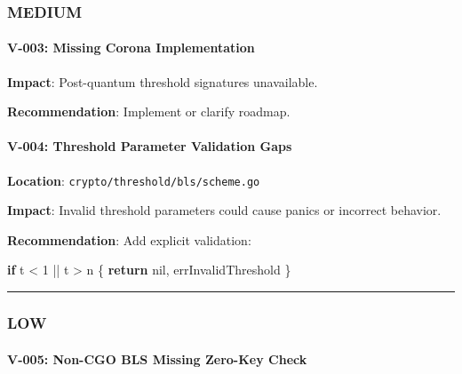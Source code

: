 \documentclass[
]{article}
\newenvironment{Shaded}{}{}
\newcommand{\ControlFlowTok}[1]{\textcolor[rgb]{0.00,0.44,0.13}{\textbf{#1}}}
\newcommand{\DecValTok}[1]{\textcolor[rgb]{0.25,0.63,0.44}{#1}}
\newcommand{\NormalTok}[1]{#1}
\newcommand{\OperatorTok}[1]{\textcolor[rgb]{0.40,0.40,0.40}{#1}}
\newcommand{\OtherTok}[1]{\textcolor[rgb]{0.00,0.44,0.13}{#1}}
\begin{document}
\subsubsection{MEDIUM}\label{medium}

\paragraph{V-003: Missing Corona
Implementation}\label{v-003-missing-corona-implementation}

\textbf{Impact}: Post-quantum threshold signatures unavailable.

\textbf{Recommendation}: Implement or clarify roadmap.

\paragraph{V-004: Threshold Parameter Validation
Gaps}\label{v-004-threshold-parameter-validation-gaps}

\textbf{Location}: \texttt{crypto/threshold/bls/scheme.go}

\textbf{Impact}: Invalid threshold parameters could cause panics or
incorrect behavior.

\textbf{Recommendation}: Add explicit validation:

\begin{Shaded}
\begin{Highlighting}[]
\ControlFlowTok{if}\NormalTok{ t }\OperatorTok{\textless{}} \DecValTok{1} \OperatorTok{||}\NormalTok{ t }\OperatorTok{\textgreater{}}\NormalTok{ n }\OperatorTok{\{}
    \ControlFlowTok{return} \OtherTok{nil}\OperatorTok{,}\NormalTok{ errInvalidThreshold}
\OperatorTok{\}}
\end{Highlighting}
\end{Shaded}

\begin{center}\rule{0.5\linewidth}{0.5pt}\end{center}

\subsubsection{LOW}\label{low}

\paragraph{V-005: Non-CGO BLS Missing Zero-Key
Check}\label{v-005-non-cgo-bls-missing-zero-key-check}
\end{document}
